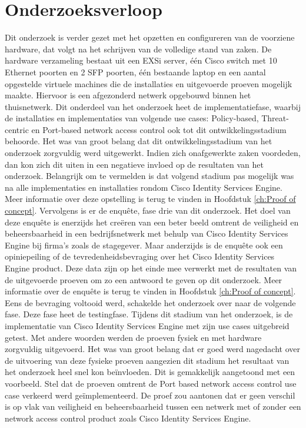 \section{Onderzoeksverloop}
Dit onderzoek is verder gezet met het opzetten en configureren van de voorziene hardware, dat volgt na het schrijven van de volledige stand van zaken. De hardware verzameling bestaat uit een EXSi server, één Cisco switch met 10 Ethernet poorten en 2 SFP poorten, één bestaande laptop en een aantal opgestelde virtuele machines die de installaties en uitgevoerde proeven mogelijk maakte. Hiervoor is een afgezonderd netwerk opgebouwd binnen het thuisnetwerk. 
Dit onderdeel van het onderzoek heet de implementatiefase, waarbij de installaties en implementaties van volgende use cases: Policy-based, Threat-centric en Port-based network access control ook tot dit ontwikkelingsstadium behoorde. 
\newline
\newline
Het was van groot belang dat dit ontwikkelingsstadium van het onderzoek zorgvuldig werd uitgewerkt. Indien zich onafgewerkte zaken voordeden, dan kon zich dit uiten in een negatieve invloed op de resultaten van het onderzoek. 
Belangrijk om te vermelden is dat volgend stadium pas mogelijk was na alle implementaties en installaties rondom Cisco Identity Services Engine. Meer informatie over deze opstelling is terug te vinden in Hoofdstuk \ref{ch:Proof of concept}.
\newline
\newline
Vervolgens is er de enquête, fase drie van dit onderzoek. Het doel van deze enquête is enerzijds het creëren van een beter beeld omtrent de veiligheid en beheersbaarheid in een bedrijfsnetwerk met behulp van Cisco Identity Services Engine bij firma’s zoals de stagegever. Maar anderzijds is de enquête ook een opiniepeiling of de tevredenheidsbevraging over het Cisco Identity Services Engine product. Deze data zijn op het einde mee verwerkt met de resultaten van de uitgevoerde proeven om zo een antwoord te geven op dit onderzoek. Meer informatie over de enquête is terug te vinden in Hoofdstuk \ref{ch:Proof of concept}.
\newline
\newline
Eens de bevraging voltooid werd, schakelde het onderzoek over naar de volgende fase. Deze fase heet de testingfase. Tijdens dit stadium van het onderzoek, is de implementatie van Cisco Identity Services Engine met zijn use cases uitgebreid getest. Met andere woorden werden de proeven fysiek en met hardware zorgvuldig uitgevoerd. Het was van groot belang dat er goed werd nagedacht over de uitvoering van deze fysieke proeven aangezien dit stadium het resultaat van het onderzoek heel snel kon beïnvloeden. Dit is gemakkelijk aangetoond met een voorbeeld. Stel dat de proeven omtrent de Port based network access control use case verkeerd werd geïmplementeerd. De proef zou aantonen dat er geen verschil is op vlak van veiligheid en beheersbaarheid tussen een netwerk met of zonder een network access control product zoals Cisco Identity Services Engine. 
